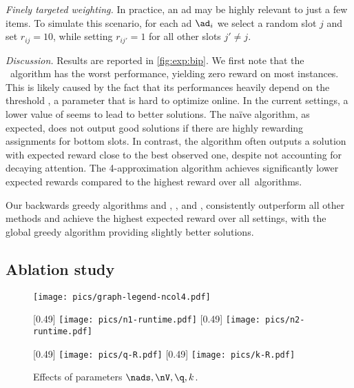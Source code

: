 \smallskip
\noindent
\emph{Finely targeted weighting.}
In practice, an ad may be highly relevant to just a few items.
To simulate this scenario,
for each ad $\ad_i$ we select a random slot $j$ and set $r_{ij}=10$, while setting $r_{ij'}=1$ for all other slots $j'\neq j$.

\smallskip
\noindent
\emph{Discussion.}
Results are reported in \cref{fig:exp:bip}.
We first note that the \alggonline\ algorithm has the worst performance, yielding zero reward on most instances. %
This is likely caused by the fact that its performances heavily depend on the threshold \Cthr, 
a parameter that is hard to optimize online.
In the current settings, a lower value  of \Cthr seems to lead to better solutions. %
The na\"{i}ve \alggforward algorithm, as expected, does not output good solutions if there are highly rewarding assignments for bottom slots.
In contrast, the \algmwm algorithm often outputs a solution with expected reward close to the best observed one, despite not accounting for decaying attention.
The 4-approximation algorithm \algflow achieves significantly lower expected rewards compared to the highest reward over all~algorithms. %

Our backwards greedy algorithms \alggback and \alggbackproxy,  \alggglobal, and \algflowg,
consistently outperform all other methods and achieve the highest expected reward over all settings,
with the global greedy algorithm \alggglobal providing slightly better solutions. %

\subsection{Ablation study}\label{sec:exp:ablation}

\begin{figure}[t]
	\centering
	
	\texttt{[image: pics/graph-legend-ncol4.pdf]}
	
	[0.49\columnwidth]{
		{\texttt{[image: pics/n1-runtime.pdf]}}
	}
	\hfill
	[0.49\columnwidth]{
		{\texttt{[image: pics/n2-runtime.pdf]}}
	}
	
	[0.49\columnwidth]{
		{\texttt{[image: pics/q-R.pdf]}}
	}
	\hfill
	[0.49\columnwidth]{
		{\texttt{[image: pics/k-R.pdf]}}
	}
	\caption{Effects of parameters $\nads, \nV, \q, k$.}
	\label{fig:exp:ablation}
\end{figure}

